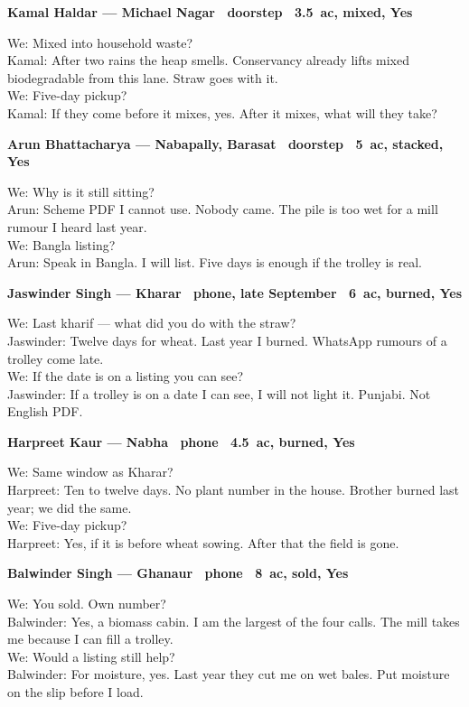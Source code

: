 \documentclass[12pt,a4paper]{article}
\newenvironment{conv}[1]{%
  \par\vspace{0.55em}%
  {\small\bfseries #1}\par\vspace{0.2em}%
  \noindent{\vrule width 2.4pt}\hspace{0.65em}%
  \begin{minipage}[t]{\dimexpr\linewidth-1.0em\relax}\small
}{%
  \end{minipage}\par\vspace{0.25em}%
}
\begin{document}
\begin{conv}{Kamal Haldar --- Michael Nagar \textbullet\ doorstep \textbullet\ 3.5~ac, mixed, Yes}
We: Mixed into household waste?\\
Kamal: After two rains the heap smells. Conservancy already lifts mixed biodegradable from this lane. Straw goes with it.\\
We: Five-day pickup?\\
Kamal: If they come before it mixes, yes. After it mixes, what will they take?
\end{conv}

\begin{conv}{Arun Bhattacharya --- Nabapally, Barasat \textbullet\ doorstep \textbullet\ 5~ac, stacked, Yes}
We: Why is it still sitting?\\
Arun: Scheme PDF I cannot use. Nobody came. The pile is too wet for a mill rumour I heard last year.\\
We: Bangla listing?\\
Arun: Speak in Bangla. I will list. Five days is enough if the trolley is real.
\end{conv}

\begin{conv}{Jaswinder Singh --- Kharar \textbullet\ phone, late September \textbullet\ 6~ac, burned, Yes}
We: Last kharif --- what did you do with the straw?\\
Jaswinder: Twelve days for wheat. Last year I burned. WhatsApp rumours of a trolley come late.\\
We: If the date is on a listing you can see?\\
Jaswinder: If a trolley is on a date I can see, I will not light it. Punjabi. Not English PDF.
\end{conv}

\begin{conv}{Harpreet Kaur --- Nabha \textbullet\ phone \textbullet\ 4.5~ac, burned, Yes}
We: Same window as Kharar?\\
Harpreet: Ten to twelve days. No plant number in the house. Brother burned last year; we did the same.\\
We: Five-day pickup?\\
Harpreet: Yes, if it is before wheat sowing. After that the field is gone.
\end{conv}

\begin{conv}{Balwinder Singh --- Ghanaur \textbullet\ phone \textbullet\ 8~ac, sold, Yes}
We: You sold. Own number?\\
Balwinder: Yes, a biomass cabin. I am the largest of the four calls. The mill takes me because I can fill a trolley.\\
We: Would a listing still help?\\
Balwinder: For moisture, yes. Last year they cut me on wet bales. Put moisture on the slip before I load.
\end{conv}
\end{document}
